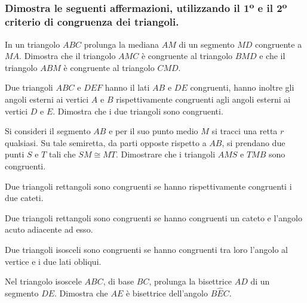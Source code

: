 \begin{multicols}{2}

\subsubsection*{Dimostra le seguenti affermazioni, utilizzando il 1\textsuperscript{o} e il 2\textsuperscript{o} criterio di congruenza dei triangoli.}

\begin{esercizio}
\label{ese:2.5}
In un triangolo $ABC$ prolunga la mediana $AM$ di un segmento $MD$ congruente a $MA$. Dimostra che il triangolo $AMC$ è congruente al triangolo $BMD$ e che il triangolo $ABM$ è congruente al triangolo $CMD$.
\end{esercizio}

\begin{esercizio}
\label{ese:2.6}
Due triangoli $ABC$ e $DEF$ hanno il lati $AB$ e $DE$ congruenti, hanno inoltre gli angoli esterni ai vertici $A$ e $B$ rispettivamente congruenti agli angoli esterni ai vertici $D$ e $E$. Dimostra che i due triangoli sono congruenti.
\end{esercizio}

\begin{esercizio}
\label{ese:2.7}
Si consideri il segmento $AB$ e per il suo punto medio $M$ si tracci una retta $r$ qualsiasi. Su tale semiretta, da parti opposte rispetto a $AB$, si prendano due punti $S$ e $T$ tali che $SM\cong MT$. Dimostrare che i triangoli $AMS$ e $TMB$ sono congruenti.
\end{esercizio}

\begin{esercizio}
\label{ese:2.8}
Due triangoli rettangoli sono congruenti se hanno rispettivamente congruenti i due cateti.
\end{esercizio}

\begin{esercizio}
\label{ese:2.9}
Due triangoli rettangoli sono congruenti se hanno congruenti un cateto e l'angolo acuto adiacente ad esso.
\end{esercizio}

\begin{esercizio}
\label{ese:2.10}
Due triangoli isosceli sono congruenti se hanno congruenti tra loro l'angolo al vertice e i due lati obliqui.
\end{esercizio}

\begin{esercizio}
\label{ese:2.11}
Nel triangolo isoscele $ABC$, di base $BC$, prolunga la bisettrice $AD$ di un segmento $DE$. Dimostra che $AE$ è bisettrice dell'angolo $B\widehat{E}C$.
\end{esercizio}


\end{multicols}
